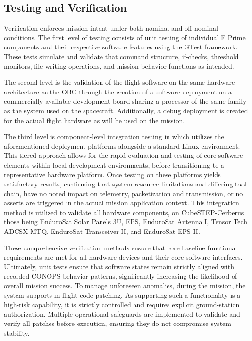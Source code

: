 \documentclass[10pt,letterpaper,twoside,fleqn]{article}
\newcommand{\Indent}{\hspace*{4\fontdimen2\font}}
\begin{document}
\subsection{Testing and Verification}

 \Indent Verification enforces mission intent under both nominal and off-nominal conditions. The first level of testing consists of unit testing of individual F Prime components and their 
 respective software features using the GTest framework. These tests simulate and validate that command structure, if-checks, threshold monitors, file-writing operations, and mission behavior functions as intended. 
 
 The second level is the validation of the flight software on the same hardware architecture as the OBC through the creation of a software deployment on a commercially available development board sharing a processor of the same family as the system used on the spacecraft. Additionally, a debug deployment is created for the actual flight hardware as will be used on the mission. 

 The third level is component-level integration testing in which utilizes the aforementioned deployment platforms alongside a standard Linux environment. This tiered approach allows for the rapid evaluation and testing of core software elements within local development environments, before transitioning to a representative hardware platform. Once testing on these platforms yields satisfactory results, confirming that system resource limitations and differing tool chain, have no noted impact on telemetry, packetization and transmission, or no asserts are triggered in the actual mission application context. This integration method is utilized to validate all hardware components, on CubeSTEP-Cerberus those being EnduroSat Solar Panels 3U, EPS, EnduroSat Antenna I, Tensor Tech ADCSX MTQ, EnduroSat Transceiver II, and EnduroSat EPS II.

These comprehensive verification methods ensure that core baseline functional requirements are met for all hardware devices and their core software interfaces. Ultimately, unit tests ensure that software states remain strictly aligned with recorded CONOPS behavior patterns, significantly increasing the likelihood of overall mission success. To manage unforeseen anomalies, during the mission, the system supports in-flight code patching. As supporting such a functionality is a high-risk capability, it is strictly controlled and requires explicit ground-station authorization. Multiple operational safeguards are implemented to validate and verify all patches before execution, ensuring they do not compromise system stability.
\end{document}
